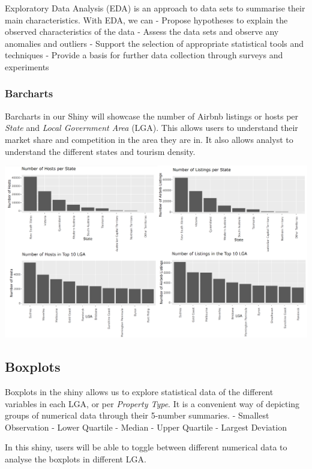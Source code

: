 \documentclass{acm_proc_article-sp}
\begin{document}
Exploratory Data Analysis (EDA) is an approach to data sets to summarise
their main characteristics. With EDA, we can - Propose hypotheses to
explain the observed characteristics of the data - Assess the data sets
and observe any anomalies and outliers - Support the selection of
appropriate statistical tools and techniques - Provide a basis for
further data collection through surveys and experiments

\hypertarget{barcharts}{%
\subsubsection{Barcharts}\label{barcharts}}

Barcharts in our Shiny will showcase the number of Airbnb listings or
hosts per \emph{State} and \emph{Local Government Area} (LGA). This
allows users to understand their market share and competition in the
area they are in. It also allows analyst to understand the different
states and tourism density.

\includegraphics{images/hostlistings.png}

\hypertarget{boxplots}{%
\subsection{Boxplots}\label{boxplots}}

Boxplots in the shiny allows us to explore statistical data of the
different variables in each LGA, or per \emph{Property Type}. It is a
convenient way of depicting groups of numerical data through their
5-number summaries. - Smallest Observation - Lower Quartile - Median -
Upper Quartile - Largest Deviation

In this shiny, users will be able to toggle between different numerical
data to analyse the boxplots in different LGA.
\end{document}
